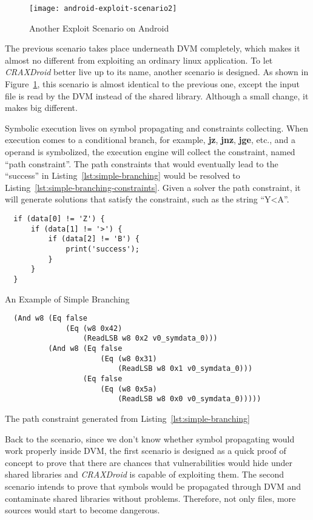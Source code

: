\begin{figure}[!ht]
  \texttt{[image: android-exploit-scenario2]}
  \caption{Another Exploit Scenario on Android}
  \label{fig:android-exploit-scenario2}
\end{figure}

The previous scenario takes place underneath DVM completely, which makes it
almost no different from exploiting an ordinary linux application. To let
\emph{CRAXDroid} better live up to its name, another scenario is designed. As
shown in Figure~\ref{fig:android-exploit-scenario2}, this scenario is almost
identical to the previous one, except the input file is read by the DVM instead
of the shared library. Although a small change, it makes big different.

Symbolic execution lives on symbol propagating and constraints collecting. When
execution comes to a conditional branch, for example, \textbf{jz},
\textbf{jnz}, \textbf{jge}, etc., and a operand is symbolized, the execution
engine will collect the constraint, named ``path constraint''. The path
constraints that would eventually lead to the ``success'' in
Listing~\ref{lst:simple-branching} would be resolved to
Listing~\ref{lst:simple-branching-constraints}. Given a solver the path
constraint, it will generate solutions that satisfy the constraint, such as the
string ``Y\textless A''.

\begin{listing}[H]
  \begin{verbatim}
  if (data[0] != 'Z') {
      if (data[1] != '>') {
          if (data[2] != 'B') {
              print('success');
          }
      }
  }
  \end{verbatim}
  \caption{An Example of Simple Branching}
  \label{lst:simple-branching}
\end{listing}

\begin{listing}[H]
  \begin{verbatim}
  (And w8 (Eq false
              (Eq (w8 0x42)
                  (ReadLSB w8 0x2 v0_symdata_0)))
          (And w8 (Eq false
                      (Eq (w8 0x31)
                          (ReadLSB w8 0x1 v0_symdata_0)))
                  (Eq false
                      (Eq (w8 0x5a)
                          (ReadLSB w8 0x0 v0_symdata_0)))))
  \end{verbatim}
  \caption{The path constraint generated from Listing~\ref{lst:simple-branching}}
  \label{lst:simple-branching-constraints}
\end{listing}

Back to the scenario, since we don't know whether symbol propagating would work
properly inside DVM, the first scenario is designed as a quick proof of concept
to prove that there are chances that vulnerabilities would hide under shared
libraries and \emph{CRAXDroid} is capable of exploiting them. The second
scenario intends to prove that symbols would be propagated through DVM and
contaminate shared libraries without problems. Therefore, not only files, more
sources would start to become dangerous.
